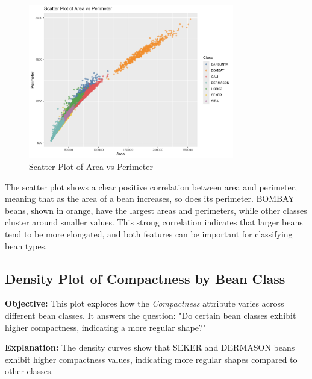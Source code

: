 \documentclass[a4paper,12pt]{article}
\begin{document}
\begin{figure}[H]
    \centering
    \includegraphics[width=0.8\textwidth]{graphs/scatter_area_perimeter.png}
    \caption{Scatter Plot of Area vs Perimeter}
    \label{fig:scatter_area_perimeter}
\end{figure}
The scatter plot shows a clear positive correlation between area and perimeter, meaning that as the area of a bean increases, so does its perimeter. BOMBAY beans, shown in orange, have the largest areas and perimeters, while other classes cluster around smaller values. This strong correlation indicates that larger beans tend to be more elongated, and both features can be important for classifying bean types.

\newpage

\subsection{Density Plot of Compactness by Bean Class}
\noindent\textbf{Objective:} This plot explores how the \textit{Compactness} attribute varies across different bean classes. It answers the question: "Do certain bean classes exhibit higher compactness, indicating a more regular shape?"

\noindent\textbf{Explanation:} The density curves show that SEKER and DERMASON beans exhibit higher compactness values, indicating more regular shapes compared to other classes.
\end{document}
